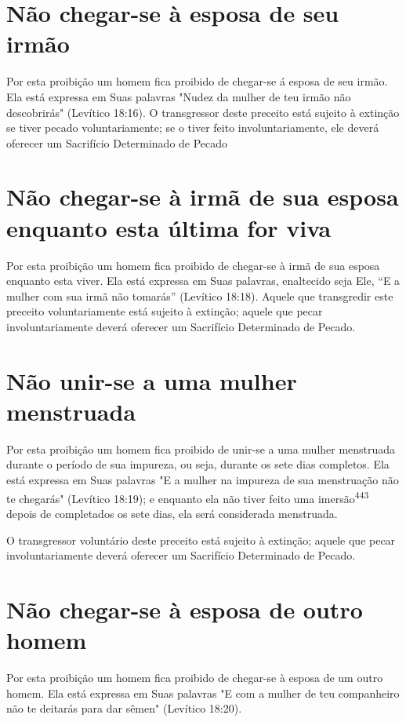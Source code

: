 \section{Não chegar-se à esposa de seu irmão}

Por esta proibição um homem fica proibido de chegar-se á esposa de seu
irmão. Ela está expressa em Suas palavras "Nudez da mulher de teu ir­mão
não descobrirás" (Levítico 18:16). O transgressor deste preceito está
sujei­to à extinção se tiver pecado voluntariamente; se o tiver feito
involuntariamen­te, ele deverá oferecer um Sacrifício Determinado de
Pecado

\section{Não chegar-se à irmã de sua esposa enquanto esta última for viva}

Por esta proibição um homem fica proibido de chegar-se à irmã de sua
esposa enquanto esta viver. Ela está expressa em Suas palavras,
enaltecido seja Ele, ``E a mulher com sua irmã não tomarás'' (Levítico
18:18). Aquele que transgredir este preceito voluntariamente está
sujeito à extinção; aquele que pe­car involuntariamente deverá oferecer
um Sacrifício Determinado de Pecado.

\section{Não unir-se a uma mulher menstruada}

Por esta proibição um homem fica proibido de unir-se a uma mu­lher
menstruada durante o período de sua impureza, ou seja, durante os sete
dias completos. Ela está expressa em Suas palavras "E a mulher na impureza de
sua menstruação não te chegarás" (Levítico 18:19); e enquanto ela não
tiver feito uma imersão\textsuperscript{443} depois de completados os
sete dias, ela será considerada menstruada.

O transgressor voluntário deste preceito está sujeito à extinção; aquele
que pecar involuntariamente deverá oferecer um Sacrifício Determinado de
Pecado.

\section{Não chegar-se à esposa de outro homem}

Por esta proibição um homem fica proibido de chegar-se à esposa de um
outro homem. Ela está expressa em Suas palavras "E com a mulher de teu
companheiro não te deitarás para dar sêmen" (Levítico 18:20).

